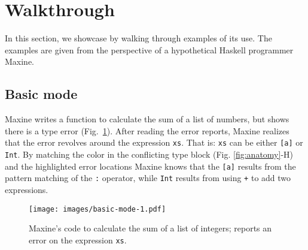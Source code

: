 \section{Walkthrough} \label{sec:walkthrough}
In this section, we showcase \chameleon{} by walking through examples of its
use. The examples are given from the perspective of a hypothetical Haskell 
programmer Maxine. 


\subsection{Basic mode} \label{sub:basic}
Maxine writes a function to calculate the sum of a list of
numbers, but \chameleon{} shows there is a type error (Fig.~\ref{fig:basic-mode-1}). 
After reading the error reports, Maxine realizes that the error revolves 
around the expression \texttt{xs}. That is: \texttt{xs} can be
either \texttt{[a]} or \texttt{Int}. By matching the color in the
conflicting type block (Fig. \ref{fig:anatomy}-H) and the highlighted error locations 
Maxine knows that the \texttt{[a]} results from the pattern matching of the
\texttt{:} operator, while \texttt{Int} results from using \texttt{+} to
 add two expressions. 

\begin{figure}
        \centering
        \texttt{[image: images/basic-mode-1.pdf]}
        \caption{
            Maxine's code to calculate the sum of a list of integers;
            \chameleon{} reports an error on the expression \texttt{xs}.
            }
            \label{fig:basic-mode-1}
\end{figure}







